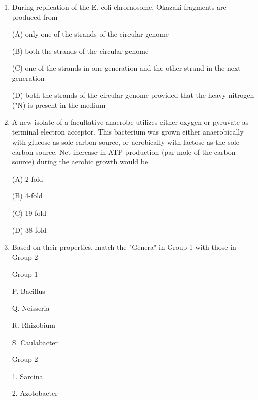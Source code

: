 \documentclass[journal]{IEEEtran}
\begin{document}
\begin{enumerate}
\begin{minipage}{0.5\textwidth}
\begin{flushleft}
4. Use of agar as solidifying agent

5. Use of carbolic acid as disinfectant
		\end{flushleft}
		\end{minipage}



(A) P-5,Q-3.R-4.S-1 (B) P-5,Q-3,R-1,5-2 (C) P-4.Q-3R-1,S-5 (D) P-3,Q-2,R-1.5-4


\item {During replication of the E. coli chromosome, Okazaki fragments are produced from

(A) only one of the strands of the circular genome

(B) both the strands of the circular genome

(C) one of the strands in one generation and the other strand in the next generation

(D) both the strands of the circular genome provided that the heavy nitrogen ("N) is present in the medium}

\item {A new isolate of a facultative anaerobe utilizes either oxygen or pyruvate as terminal electron acceptor. This bacterium was grown either anaerobically with glucose as sole carbon source, or aerobically with lactose as the sole carbon source. Net increase in ATP production (par mole of the carbon source) during the aerobic growth would be

(A) 2-fold

(B) 4-fold

(C) 19-fold

(D) 38-fold
}
\item {Based on their properties, match the "Genera" in Group 1 with those in Group 2}
\begin{minipage}{0.5\textwidth}
	\begin{flushleft}


Group 1

P. Bacillus

Q. Neisseria

R. Rhizobium

S. Caulabacter
		\end{flushleft}
		\end{minipage}
	\begin{minipage}{0.5\textwidth}
		\begin{flushleft}

Group 2

1. Sarcina

2. Azotobacter


\end{flushleft}
\end{minipage}
\end{enumerate}
\end{document}
